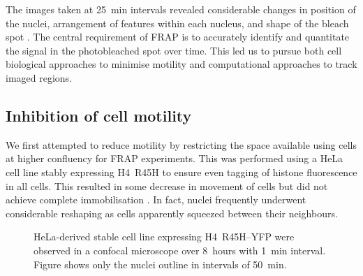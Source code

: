     The images taken at \SI{25}{\minute} intervals revealed considerable changes
    in position of the nuclei, arrangement of features within each nucleus,
    and shape of the bleach spot .
    The central requirement of FRAP is to accurately identify and
    quantitate the signal in the photobleached spot over time.
    This led us to pursue both cell biological approaches to minimise motility
    and computational approaches to track imaged \mbox{regions}.

  \subsection{Inhibition of cell motility}

    We first attempted to reduce motility by restricting the space available
    using cells at higher confluency for FRAP experiments.
    This was performed using a HeLa cell line stably expressing
    H4~R45H to ensure even
    tagging of histone fluorescence in all cells.
    This resulted in some decrease in movement of cells
    but did not achieve complete immobilisation
    .
    In fact, nuclei frequently underwent considerable reshaping as cells
    apparently squeezed between their neighbours.

    \begin{figure}
      \centering
        {
          HeLa-derived stable cell line expressing H4~R45H--YFP
          were observed in a confocal microscope over 8~hours with
          \SI{1}{\minute} interval.  Figure shows only the nuclei outline
          in intervals of \SI{50}{\minute}.
        }
      \label{fig:kill-frap:confluent-hela}
    \end{figure}


